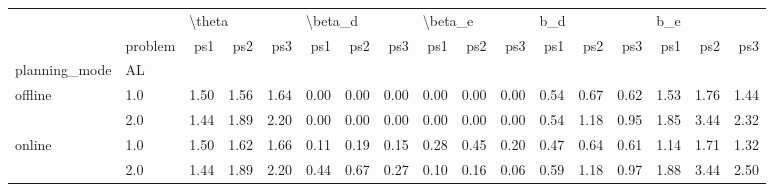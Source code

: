 \begin{tabular}{llrrrrrrrrrrrrrrr}
\toprule
       & {} & \multicolumn{3}{l}{\textbackslash theta} & \multicolumn{3}{l}{\textbackslash beta\_d} & \multicolumn{3}{l}{\textbackslash beta\_e} & \multicolumn{3}{l}{b\_d} & \multicolumn{3}{l}{b\_e} \\
       & problem &    ps1 &  ps2 &  ps3 &     ps1 &  ps2 &  ps3 &     ps1 &  ps2 &  ps3 &  ps1 &  ps2 &  ps3 &  ps1 &  ps2 &  ps3 \\
planning\_mode & AL &        &      &      &         &      &      &         &      &      &      &      &      &      &      &      \\
\midrule
offline & 1.0 &   1.50 & 1.56 & 1.64 &    0.00 & 0.00 & 0.00 &    0.00 & 0.00 & 0.00 & 0.54 & 0.67 & 0.62 & 1.53 & 1.76 & 1.44 \\
       & 2.0 &   1.44 & 1.89 & 2.20 &    0.00 & 0.00 & 0.00 &    0.00 & 0.00 & 0.00 & 0.54 & 1.18 & 0.95 & 1.85 & 3.44 & 2.32 \\
online & 1.0 &   1.50 & 1.62 & 1.66 &    0.11 & 0.19 & 0.15 &    0.28 & 0.45 & 0.20 & 0.47 & 0.64 & 0.61 & 1.14 & 1.71 & 1.32 \\
       & 2.0 &   1.44 & 1.89 & 2.20 &    0.44 & 0.67 & 0.27 &    0.10 & 0.16 & 0.06 & 0.59 & 1.18 & 0.97 & 1.88 & 3.44 & 2.50 \\
\bottomrule
\end{tabular}
